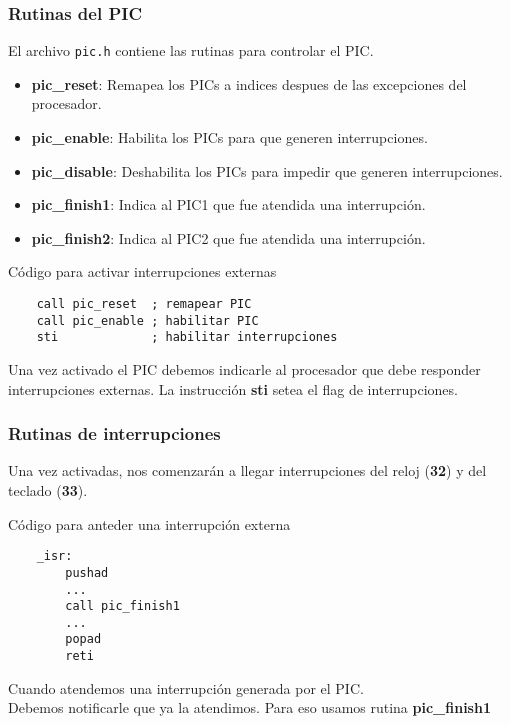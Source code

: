 \documentclass[aspectratio=169]{beamer}
\begin{document}
\begin{frame}[fragile]
\frametitle{Rutinas del PIC}
    El archivo \texttt{pic.h} contiene las rutinas para controlar el PIC.\\
    \begin{itemize}
    \small
        \item \textbf{pic\_reset}: Remapea los PICs a indices despues de las excepciones del procesador.
        \pause
        \item \textbf{pic\_enable}: Habilita los PICs para que generen interrupciones.
        \item \textbf{pic\_disable}: Deshabilita los PICs para impedir que generen interrupciones.
        \pause
        \item \textbf{pic\_finish1}: Indica al PIC1 que fue atendida una interrupción.
        \item \textbf{pic\_finish2}: Indica al PIC2 que fue atendida una interrupción.
    \end{itemize}
    \pause
    \begin{block}{\small Código para activar interrupciones externas}
    \vspace{-0.3cm}
    \small
    \begin{verbatim}
    call pic_reset  ; remapear PIC
    call pic_enable ; habilitar PIC
    sti             ; habilitar interrupciones
    \end{verbatim}
    \vspace{-0.7cm}
    \end{block}
    Una vez activado el PIC debemos indicarle al procesador que debe responder interrupciones externas.
    La instrucción \textbf{sti} setea el flag de interrupciones.
\end{frame}

\begin{frame}[fragile]
\frametitle{Rutinas de interrupciones}
    Una vez activadas, nos comenzarán a llegar interrupciones del reloj (\textbf{32}) y del teclado (\textbf{33}).
    \pause
    \begin{block}{\small Código para anteder una interrupción externa}
    \vspace{-0.3cm}
    \small
    \begin{verbatim}
    _isr:
        pushad
        ...
        call pic_finish1
        ...
        popad
        reti
    \end{verbatim}
    \vspace{-0.7cm}
    \end{block}
    Cuando atendemos una interrupción generada por el PIC. \\ Debemos notificarle que ya la atendimos. Para eso usamos rutina \textbf{pic\_finish1}
\end{frame}
\end{document}
